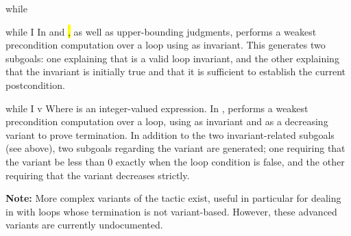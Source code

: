 \begin{tactic}{while}
  \begin{tsyntax}{while I}
  In \prhl and \hl, as well as upper-bounding \phl judgments, performs
  a weakest precondition computation over a loop using  as
  invariant. This generates two subgoals: one explaining that 
  is a valid loop invariant, and the other explaining that the
  invariant is initially true and that it is sufficient to establish
  the current postcondition.
  \end{tsyntax}

  \begin{tsyntax}{while I v}
  Where  is an integer-valued expression. In \phl, performs a
  weakest precondition computation over a loop, using  as
  invariant and  as a decreasing variant to prove
  termination. In addition to the two invariant-related subgoals (see
  above), two subgoals regarding the variant are generated; one
  requiring that the variant be less than 0 exactly when the loop
  condition is false, and the other requiring that the variant
  decreases strictly.
  \end{tsyntax}

  \textbf{Note:} More complex variants of the  tactic
  exist, useful in particular for dealing in \phl with loops whose
  termination is not variant-based. However, these advanced variants
  are currently undocumented.
\end{tactic}
